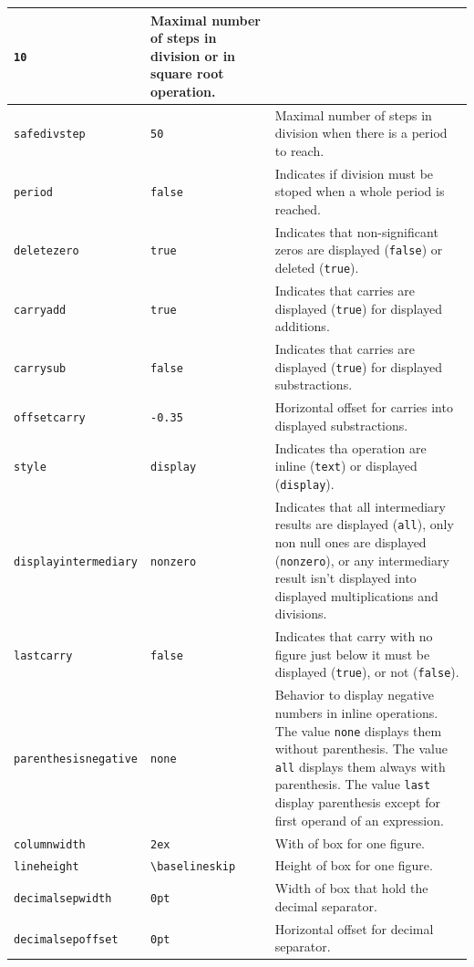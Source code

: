 \documentclass[12pt]{report}
\begin{document}
\begin{longtable}{|l|l|p{7cm}|}
  \verb+10+ &
  Maximal number of steps in division or in square root
  operation. \\\hline
  \verb+safedivstep+ &
  \verb+50+ &
  Maximal number of steps in division when there is a period to
  reach. \\\hline
  \verb+period+ &
  \verb+false+ &
  Indicates if division must be stoped when a whole period is
  reached. \\\hline
  \verb+deletezero+ &
  \verb+true+ &
  Indicates that non-significant zeros are displayed (\verb+false+) or
  deleted (\verb+true+). \\\hline
  \verb+carryadd+ &
  \verb+true+ &
  Indicates that carries are displayed (\verb+true+) for displayed
  additions. \\\hline
  \verb+carrysub+ &
  \verb+false+ &
  Indicates that carries are displayed (\verb+true+) for displayed
  substractions. \\\hline
  \verb+offsetcarry+ &
  \verb+-0.35+ &
  Horizontal offset for carries into displayed substractions. \\\hline
  \verb+style+ &
  \verb+display+ &
  Indicates tha operation are inline (\verb+text+) or displayed
  (\verb+display+). \\\hline
  \verb+displayintermediary+ &
  \verb+nonzero+ &
  Indicates that all intermediary results are displayed (\verb+all+),
  only non null ones are displayed (\verb+nonzero+), or any
  intermediary result isn't displayed into displayed multiplications
  and divisions. \\\hline
  \verb+lastcarry+ &
  \verb+false+ &
  Indicates that carry with no figure just below it must be displayed
  (\verb+true+), or not (\verb+false+). \\\hline
  \verb+parenthesisnegative+ &
  \verb+none+ &
  Behavior to display negative numbers in inline operations. The value
  \verb+none+ displays them without parenthesis. The value \verb+all+
  displays them always with parenthesis. The value \verb+last+ display
  parenthesis except for first operand of an expression. \\\hline
  \verb+columnwidth+ &
  \verb+2ex+ &
  With of box for one figure. \\\hline
  \verb+lineheight+ &
  \verb+\baselineskip+ &
  Height of box for one figure. \\\hline
  \verb+decimalsepwidth+ &
  \verb+0pt+ &
  Width of box that hold the decimal separator. \\\hline
  \verb+decimalsepoffset+ &
  \verb+0pt+ &
  Horizontal offset for decimal separator. \\\hline

\end{longtable}
\end{document}

